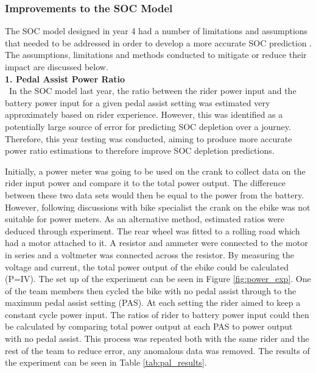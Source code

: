 \documentclass[a4paper, 10pt]{article}
\numberwithin{equation}{section}
\begin{document}
\subsubsection{Improvements to the SOC Model}

\label{section:SOC_factors}

The SOC model designed in year 4 had a number of limitations and assumptions that needed to be addressed in order to develop a more accurate SOC prediction \cite{report:energy}. The assumptions, limitations and methods conducted to mitigate or reduce their impact are discussed below.
\vspace{11pt}
\\
\textbf{1. Pedal Assist Power Ratio}
\\
\
In the SOC model last year, the ratio between the rider power input and the battery power input for a given pedal assist setting was estimated very approximately based on rider experience. However, this was identified as a potentially large source of error for predicting SOC depletion over a journey. Therefore, this year testing was conducted, aiming to produce more accurate power ratio estimations to therefore improve SOC depletion predictions.

Initially, a power meter was going to be used on the crank to collect data on the rider input power and compare it to the total power output. The difference between these two data sets would then be equal to the power from the battery. However, following discussions with bike specialist the crank on the ebike was not suitable for power meters. As an alternative method, estimated ratios were deduced through experiment. The rear wheel was fitted to a rolling road which had a motor attached to it. A resistor and ammeter were connected to the motor in series and a voltmeter was connected across the resistor. By measuring the voltage and current, the total power output of the ebike could be calculated (P=IV). The set up of the experiment can be seen in Figure \ref{fig:power_exp}. One of the team members then cycled the bike with no pedal assist through to the maximum pedal assist setting (PAS). At each setting the rider aimed to keep a constant cycle power input. The ratios of rider to battery power input could then be calculated by comparing total power output at each PAS to power output with no pedal assist. This process was repeated both with the same rider and the rest of the team to reduce error, any anomalous data was removed. The results of the experiment can be seen in Table \ref{tab:pal_results}.
\end{document}
